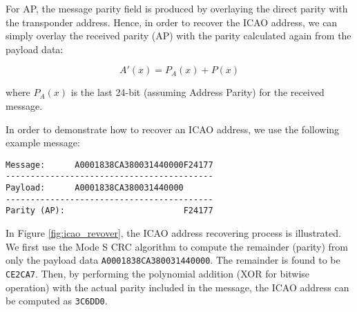 For AP, the message parity field is produced by overlaying the direct parity with the transponder address. Hence, in order to recover the ICAO address, we can simply overlay the received parity (AP) with the parity calculated again from the payload data:

\begin{equation}
  A'(x) = P_A(x) + P(x)
\end{equation}

\noindent where $P_A(x)$ is the last 24-bit (assuming Address Parity) for the received message.

In order to demonstrate how to recover an ICAO address, we use the following example message:

\begin{verbatim}
Message:      A0001838CA380031440000F24177
------------------------------------------
Payload:      A0001838CA380031440000
------------------------------------------
Parity (AP):                        F24177
\end{verbatim}

In Figure \ref{fig:icao_revover}, the ICAO address recovering process is illustrated. We first use the Mode S CRC algorithm to compute the remainder (parity) from only the payload data \texttt{A0001838CA380031440000}. The remainder is found to be \texttt{CE2CA7}. Then, by performing the polynomial addition (XOR for bitwise operation) with the actual parity included in the message, the ICAO address can be computed as \texttt{3C6DD0}.

